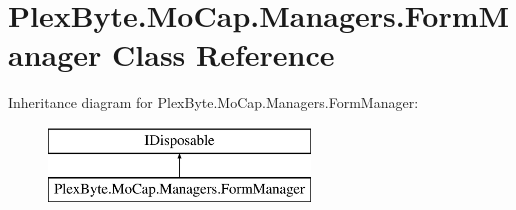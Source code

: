 \hypertarget{class_plex_byte_1_1_mo_cap_1_1_managers_1_1_form_manager}{}\section{Plex\+Byte.\+Mo\+Cap.\+Managers.\+Form\+Manager Class Reference}
\label{class_plex_byte_1_1_mo_cap_1_1_managers_1_1_form_manager}
Inheritance diagram for Plex\+Byte.\+Mo\+Cap.\+Managers.\+Form\+Manager\+:\begin{figure}[H]
\begin{center}
\leavevmode
\includegraphics[height=2.000000cm]{class_plex_byte_1_1_mo_cap_1_1_managers_1_1_form_manager}
\end{center}
\end{figure}
